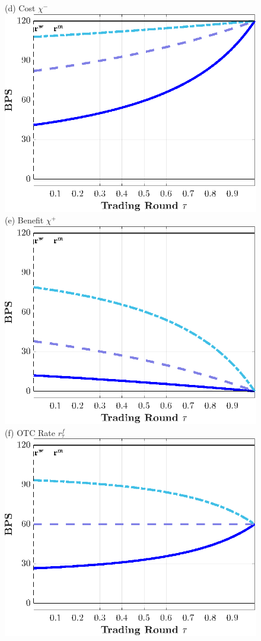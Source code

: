 \documentclass[12pt,american,english,notitlepage]{article}
\begin{document}
\begin{figure}[H]
\begin{centering}
\centering (d) Cost $\chi^{-}$ \\[2pt]
\includegraphics[width=0.8\linewidth]{NewCode/Figures/F_cd_Chiminus_tau.eps}
\endminipage\hfill
{}
\centering (e) Benefit $\chi^{+}$ \\[2pt]
\includegraphics[width=0.8\linewidth]{NewCode/Figures/F_cd_Chiplus_tau.eps}
\endminipage\hfill
{}
\centering (f) OTC Rate $r^{f}_{\tau}$ \\[2pt]
\includegraphics[width=0.8\linewidth]{NewCode/Figures/F_cd_InterbankRate_tau.eps}

\end{centering}
\end{figure}
\end{document}
